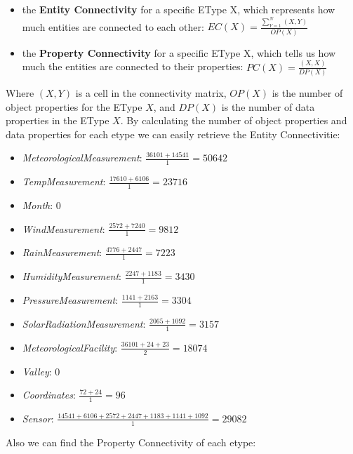 \begin{itemize}
	\item the \textbf{Entity Connectivity} for a specific EType X, which
	represents how much entities are connected to each other: $EC(X) = \frac{\sum^N_{Y=1}{(X,Y)}}{OP(X)}$
	\item the \textbf{Property Connectivity} for a specific EType X, which tells us
	how much the entities are connected to their properties: $PC(X) = \frac{(X,X)}{DP(X)}$
\end{itemize}

Where $(X,Y)$ is a cell in the connectivity matrix, $OP(X)$ is the number of object properties
for the EType $X$, and $DP(X)$ is the number of data properties in the EType $X$. By calculating
the number of object properties and data properties for each etype we can easily retrieve 
the Entity Connectivitie:
\begin{itemize}
	\item \textit{MeteorologicalMeasurement}: $\frac{36101+14541}{1} = 50642$
	\item \textit{TempMeasurement}: $\frac{17610+6106}{1} = 23716$
	\item \textit{Month}: $0$
	\item \textit{WindMeasurement}: $\frac{2572+7240}{1} = 9812$
	\item \textit{RainMeasurement}: $\frac{4776+2447}{1} = 7223$
	\item \textit{HumidityMeasurement}: $\frac{2247+1183}{1} = 3430$
	\item \textit{PressureMeasurement}: $\frac{1141+2163}{1} = 3304$
	\item \textit{SolarRadiationMeasurement}: $\frac{2065+1092}{1} = 3157$
	\item \textit{MeteorologicalFacility}: $\frac{36101+24+23}{2} = 18074$
	\item \textit{Valley}: $0$
	\item \textit{Coordinates}: $\frac{72+24}{1} = 96$
	\item \textit{Sensor}: $\frac{14541+6106+2572+2447+1183+1141+1092}{1} = 29082$
\end{itemize}
Also we can find the Property Connectivity of each etype:
